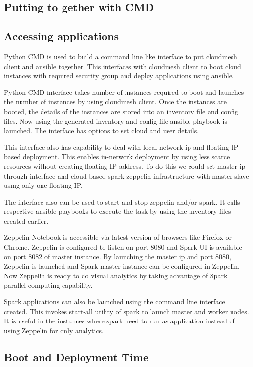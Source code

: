 \documentclass[9pt,twocolumn,twoside]{../../styles/osajnl}
\begin{document}
	\subsection{Putting to gether with CMD}
	
	\subsection{Accessing applications}
	Python CMD is used to build a command line like interface to put
	cloudmesh client and ansible together. This interfaces with 
	cloudmesh
	client to boot cloud instances with required security group and
	deploy applications using ansible.
	
	Python CMD interface takes number of instances required to boot 
	and
	launches the number of instances by using cloudmesh client. Once 
	the
	instances are booted, the details of the instances are stored 
	into an
	inventory file and config files. Now using the generated 
	inventory and
	config file ansible playbook is launched. The interface has 
	options to
	set cloud and user details.
	
	This interface also has capability to deal with local network ip 
	and
	floating IP based deployment. This enables in-network deployment 
	by
	using less scarce resources without creating floating IP address. 
	To do this
	we could set master ip through interface and cloud based
	spark-zeppelin infrastructure with master-slave using only one
	floating IP.
	
	The interface also can be used to start and stop zeppelin and/or
	spark. It calls respective ansible playbooks to execute the task 
	by
	using the inventory files created earlier. 
	
	Zeppelin Notebook is accessible via latest version of browsers 
	like
	Firefox or Chrome. Zeppelin is configured to listen on port 8080 
	and
	Spark UI is available on port 8082 of master instance. By 
	launching
	the master ip and port 8080, Zeppelin is launched and Spark master
	instance can be configured in Zeppelin. Now Zeppelin is ready to 
	do
	visual analytics by taking advantage of Spark parallel computing
	capability.
	
	Spark applications can also be launched using the command line
	interface created. This invokes start-all utility of spark to 
	launch
	master and worker nodes. It is useful in the instances where spark
	need to run as application instead of using Zeppelin for only 
	analytics.
	
	\subsection{Boot and Deployment Time}
	
\end{document}
